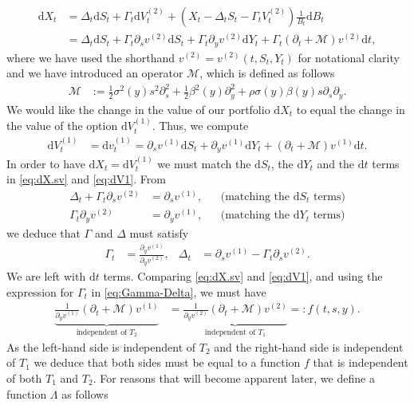 \documentclass[12pt]{book}
\numberwithin{equation}{chapter}
\theoremstyle{plain}
\numberwithin{theorem}{section}
\theoremstyle{definition}
\numberwithin{exercise}{chapter}
\newcommand{\<}{\langle}
\renewcommand{\>}{\rangle}
\renewcommand{\(}{\left(}
\renewcommand{\)}{\right)}
\renewcommand{\[}{\left[}
\renewcommand{\]}{\right]}
\newcommand\Mc{\mathscr{M}}
\newcommand\Lam{\Lambda}
\newcommand\Gam{\Gamma}
\newcommand\Del{\Delta}
\renewcommand\d{\partial}
\newcommand\dd{\mathrm{d}}
\theoremstyle{definition}
\numberwithin{question}{section}
\begin{document}
\begin{align}
\dd X_t 
	&= \Delta_t \dd S_t + \Gamma_t \dd V_t^{(2)} + (X_t - \Del_t S_t - \Gam_t V_t^{(2)}) \frac{1}{B_t} \dd B_t \\
	&= \Delta_t \dd S_t + \Gamma_t \d_s v^{(2)} \dd S_t + \Gamma_t \d_y v^{(2)} \dd Y_t + \Gamma_t (\d_t + \mathscr{M}) v^{(2)} \dd t, \label{eq:dX.sv}
\end{align}
where we have used the shorthand  $v^{(2)}=v^{(2)}(t,S_t,Y_t)$ for notational clarity and we have introduced an operator $\Mc$, which is defined as follows
\begin{align}
\Mc
	&:= \frac{1}{2} \sigma^2(y) s^2 \d_{s}^2 + \frac{1}{2} \beta^2(y) \d_y^2 + \rho \sigma(y) \beta(y) s \d_s \d_y .
\end{align}
We would like the change in the value of our portfolio $\dd X_t$ to equal the change in the value of the option $\dd V_t^{(1)}$.  Thus, we compute
\begin{align}
\dd V_t^{(1)}
	&=	\dd v_t^{(1)} 
	=		\d_s v^{(1)} \dd S_t + \d_y v^{(1)} \dd Y_t + (\d_t + \Mc ) v^{(1)} \dd t . \label{eq:dV1}
\end{align}
In order to have $\dd X_t = \dd V_t^{(1)}$ we must match the $\dd S_t$, the $\dd Y_t$ and the $\dd t$ terms in \eqref{eq:dX.sv} and \eqref{eq:dV1}.  From
\begin{align}
\Delta_t + \Gamma_t \d_s v^{(2)} 
		&= \d_s v^{(1)} , & 
		&\text{(matching the $\dd S_t$ terms)} \\
\Gamma_t \d_y v^{(2)} 
		&= \d_y v^{(1)} , &
		&\text{(matching the $\dd Y_t$ terms)} 
\end{align}
we deduce that $\Gam$ and $\Del$ must satisfy
\begin{align}
\Gamma_t 
	&= \frac{ \d_y v^{(1)} }{ \d_y v^{(2)} } , &
\Delta_t 
	&= \d_s v^{(1)} - \Gamma_t \d_s v^{(2)} . \label{eq:Gamma-Delta}
\end{align}
We are left with $\dd t$ terms.  Comparing \eqref{eq:dX.sv} and \eqref{eq:dV1}, and using the expression for $\Gam_t$ in \eqref{eq:Gamma-Delta}, we must have
\begin{align} \label{eq:stoch_vol}
	\underbrace{\frac{1}{\d_y v^{(1)}} (\d_t + \Mc) v^{(1)}}_{\text{independent of } T_2} 
		&= \underbrace{\frac{1}{ \d_y v^{(2)} } (\d_t + \Mc) v^{(2)}}_{\text{independent of } T_1} =: f(t,s,y).
\end{align}
As the left-hand side is independent of $T_2$ and the right-hand side is independent of $T_1$ we deduce that both sides must be equal to a function $f$ that is independent of both $T_1$ and $T_2$. For reasons that will become apparent later, we define a function $\Lam$ as follows
\end{document}
